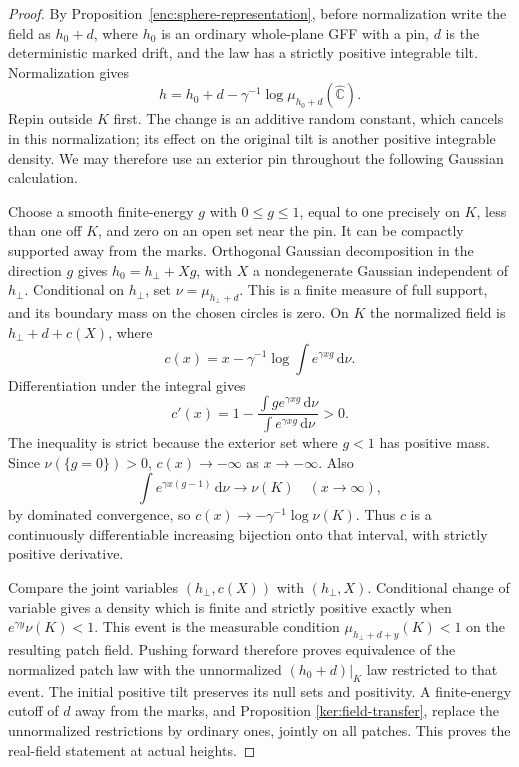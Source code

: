 \documentclass[11pt]{article}
\numberwithin{equation}{section}
\theoremstyle{definition}
\theoremstyle{remark}
\newcommand{\Chat}{\widehat{\mathbb C}}
\newcommand{\dd}{\mathrm d}
\newcommand{\1}{\mathbf 1}
\begin{document}
\begin{proof}
By Proposition~\ref{enc:sphere-representation}, before normalization
write the field as \(h_0+d\), where \(h_0\) is an ordinary whole-plane
GFF with a pin, \(d\) is the deterministic marked drift, and the law
has a strictly positive integrable tilt.  Normalization gives
\[
 h=h_0+d-\gamma^{-1}\log\mu_{h_0+d}(\Chat).
\]
Repin outside \(K\) first.  The change is an additive random constant,
which cancels in this normalization; its effect on the original tilt
is another positive integrable density.  We may therefore use an
exterior pin throughout the following Gaussian calculation.

Choose a smooth finite-energy \(g\) with \(0\le g\le1\), equal to
one precisely on \(K\), less than one off \(K\), and zero on an
open set near the pin.  It can be compactly supported away from the
marks.  Orthogonal Gaussian decomposition in the direction \(g\)
gives \(h_0=h_\perp+Xg\), with \(X\) a nondegenerate Gaussian
independent of \(h_\perp\).  Conditional on \(h_\perp\), set
\(\nu=\mu_{h_\perp+d}\).  This is a finite measure of full support,
and its boundary mass on the chosen circles is zero.  On \(K\) the
normalized field is \(h_\perp+d+c(X)\), where
\[
 c(x)=x-\gamma^{-1}\log\int e^{\gamma xg}\,\dd\nu.
\]
Differentiation under the integral gives
\[
 c'(x)=1-
 \frac{\int g e^{\gamma xg}\,\dd\nu}
      {\int e^{\gamma xg}\,\dd\nu}>0.
\]
The inequality is strict because the exterior set where \(g<1\)
has positive mass.  Since \(\nu(\{g=0\})>0\), \(c(x)\to-\infty\)
as \(x\to-\infty\).  Also
\[
 \int e^{\gamma x(g-1)}\,\dd\nu\longrightarrow\nu(K)
 \quad(x\to\infty),
\]
by dominated convergence, so
\(c(x)\to-\gamma^{-1}\log\nu(K)\).
Thus \(c\) is a continuously differentiable increasing bijection
onto that interval, with strictly positive derivative.

Compare the joint variables \((h_\perp,c(X))\) with
\((h_\perp,X)\).  Conditional change of variable gives a density
which is finite and strictly positive exactly when
\(e^{\gamma y}\nu(K)<1\).  This event is the measurable condition
\(\mu_{h_\perp+d+y}(K)<1\) on the resulting patch field.  Pushing
forward therefore proves equivalence of the normalized patch law
with the unnormalized \((h_0+d)|_K\) law restricted to that event.
The initial positive tilt preserves its null sets and positivity.
A finite-energy cutoff of \(d\) away from the marks, and Proposition
\ref{ker:field-transfer}, replace the unnormalized restrictions by
ordinary ones, jointly on all patches.  This proves the real-field
statement at actual heights.


\end{proof}
\end{document}
